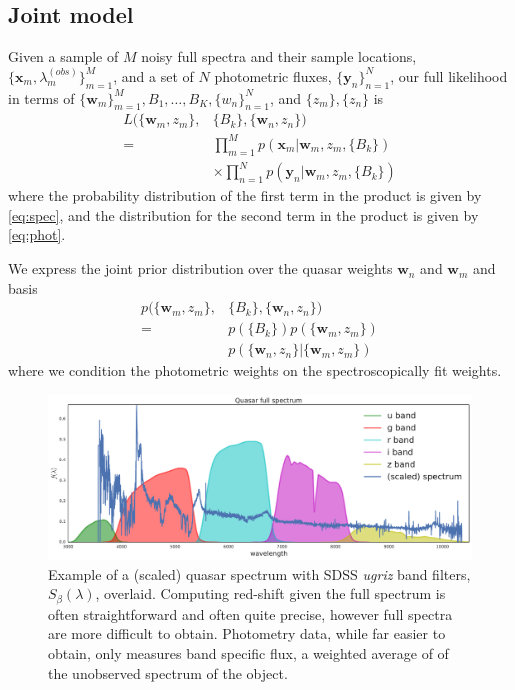 \documentclass{article}
\begin{document}
\subsection{Joint model}
Given a sample of $M$ noisy full spectra and their sample locations, $\{\mathbf{x}_m, \lambda^{(obs)}_m \}_{m=1}^M$, and a set of $N$ photometric fluxes, $\{\mathbf{y}_n\}_{n=1}^N$, our full likelihood in terms of $\{ \mathbf{w}_m \}_{m=1}^M, B_1, \dots, B_K, \{ w_n \}_{n=1}^N$, and $\{z_m\}, \{z_n\}$ is 
\begin{align*}
  L( \{ \mathbf{w}_m, z_m \}, &\{ B_k \}, \{ \mathbf{w}_n, z_n \} )  \\
    = & \prod_{m=1}^M p( \mathbf{x}_m | \mathbf{w}_m, z_m, \{ B_k \})  \\
      & \times \prod_{n=1}^N p( \mathbf{y}_n | \mathbf{w}_m, z_m, \{ B_k \})
\end{align*}
where the probability distribution of the first term in the product is given by \ref{eq:spec}, and the distribution for the second term in the product is given by \ref{eq:phot}.  

We express the joint prior distribution over the quasar weights $\mathbf{w}_n$ and $\mathbf{w}_m$ and basis 
\begin{align}
  p( \{ \mathbf{w}_m, z_m \}, &\{ B_k \}, \{ \mathbf{w}_n, z_n \} )  \\
    = & p(\{ B_k \}) p( \{ \mathbf{w}_m, z_m \} )  \\
      & p( \{ \mathbf{w}_n, z_n \} | \{ \mathbf{w}_m, z_m \} ) 
\end{align}
where we condition the photometric weights on the spectroscopically fit weights.  

\begin{figure}[ht]
\vskip 0.2in
\begin{center}
\centerline{\includegraphics[width=2\columnwidth]{../figs/quasar_spectrum_sdss_filters}}
\caption{Example of a (scaled) quasar spectrum with SDSS \emph{ugriz} band filters, $S_{\beta}(\lambda)$, overlaid.  Computing red-shift given the full spectrum is often straightforward and often quite precise, however full spectra are more difficult to obtain.  Photometry data, while far easier to obtain, only measures band specific flux, a weighted average of of the unobserved spectrum of the object. }
\label{fig:filters}
\end{center}
\vskip -0.2in
\end{figure} 
\end{document}
